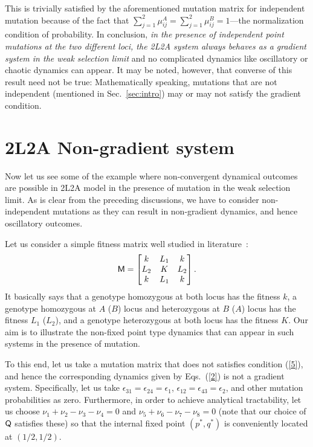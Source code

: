 \documentclass[
 pre,
 aps,
 a4paper,
 english,
 showkeys,
 reprint,
 twocolumn,
 superscriptaddress
]{revtex4}
\begin{document}
This is trivially satisfied by the aforementioned mutation matrix for independent mutation because of the fact that $\sum_{j=1}^2\mu^A_{ij}=\sum_{j=1}^2\mu^B_{ij}=1$---the normalization condition of probability. In conclusion, \emph{in the presence of independent point mutations at the two different loci, the 2L2A system always behaves as a gradient system in the weak selection limit} and no complicated dynamics like oscillatory or chaotic dynamics can appear. It may be noted, however, that converse of this {\color{black}result need not} be true: Mathematically speaking, mutations that are not independent (mentioned in Sec.~\ref{sec:intro}) may or may not satisfy the gradient condition.

\section{2L2A Non-gradient system}\label{section_4}
Now let us see some of the example where non-convergent dynamical outcomes are possible in 2L2A model in the presence of mutation in the weak selection limit. As is clear from the preceding discussions, we have to consider non-independent mutations as they can result in non-gradient dynamics, and hence oscillatory outcomes. 

Let us consider a simple fitness matrix well studied in literature~{\cite{lewontin1960evolution,hastings1981PNAS}}: 
%
\begin{equation}\label{57}
\sf{M}=\begin{bmatrix}
k & L_1 & k\\ 
L_2 & K & L_2\\
k& L_1 & k
\end{bmatrix}.
\end{equation} 
It basically says that a genotype homozygous at both locus has the fitness $k$, a genotype homozygous at $A$ ($B$) locus and heterozygous at $B$ ($A$) locus has the fitness $L_1$ ($L_2$), and a genotype heterozygous at both locus has the fitness $K$. Our aim is to illustrate the non-fixed point type dynamics that can appear in such systems in the presence of mutation.

To this end, let us take a mutation matrix that does not satisfies condition (\ref{5}), and hence the corresponding dynamics given by  Eqs.~(\ref{2}) is not a gradient system. Specifically, let us take $\epsilon_{31}=\epsilon_{24}=\epsilon_1$, $\epsilon_{12}=\epsilon_{43}=\epsilon_2$, and other mutation probabilities as zero. Furthermore, in order to achieve analytical tractability, let us choose $\nu_1+\nu_2-\nu_3-\nu_4=0$ and $\nu_5+\nu_6-\nu_7-\nu_8=0$ (note that our choice of ${\sf Q}$ satisfies these) so that the internal fixed point $(p^*,q^*)$ is conveniently located at $(1/2,1/2)$. 
\end{document}
